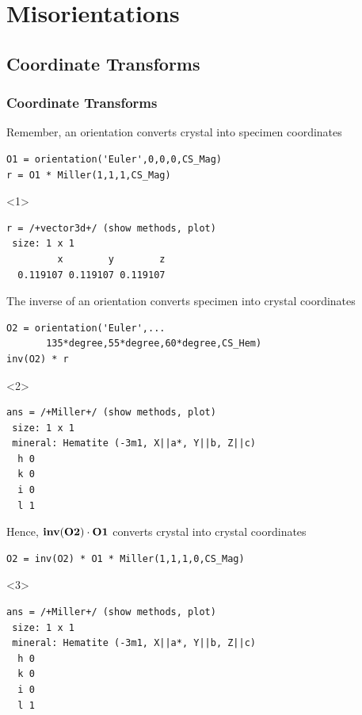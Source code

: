 \documentclass[compress]{beamer}
\begin{document}
\section{Misorientations}


\subsection*{Coordinate Transforms}
\label{sec:orientations}


\begin{frame}[fragile]
  \frametitle{Coordinate Transforms}

  \begin{overlayarea}{\textwidth}{8cm}
  Remember, an orientation converts crystal into specimen
  coordinates
  \vspace{-.2cm}
  \begin{lstlisting}[style=input]
O1 = orientation('Euler',0,0,0,CS_Mag)
r = O1 * Miller(1,1,1,CS_Mag)
\end{lstlisting}
  \begin{onlyenv}<1>
\vspace{-.3cm}\begin{lstlisting}[style=output]
r = /+vector3d+/ (show methods, plot)
 size: 1 x 1
         x        y        z
  0.119107 0.119107 0.119107
\end{lstlisting}
  \end{onlyenv}

  \pause
  \medskip

  The inverse of an orientation converts specimen into crystal coordinates
  \vspace{-.2cm}
  \begin{lstlisting}[style=input]
O2 = orientation('Euler',...
       135*degree,55*degree,60*degree,CS_Hem)
inv(O2) * r
\end{lstlisting}
  \begin{onlyenv}<2>
    \vspace{-.3cm}
    \begin{lstlisting}[style=output]
ans = /+Miller+/ (show methods, plot)
 size: 1 x 1
 mineral: Hematite (-3m1, X||a*, Y||b, Z||c)
  h 0
  k 0
  i 0
  l 1

\end{lstlisting}
  \end{onlyenv}

  \pause
  \medskip

  Hence, $\text{\bf inv}(\mathbf{O2}) \cdot \mathbf{O1}$ converts crystal  into
  crystal coordinates
    \vspace{-.2cm}
  \begin{lstlisting}[style=input]
O2 = inv(O2) * O1 * Miller(1,1,1,0,CS_Mag)
  \end{lstlisting}
  \begin{onlyenv}<3>
    \vspace{-.3cm}
    \begin{lstlisting}[style=output]
ans = /+Miller+/ (show methods, plot)
 size: 1 x 1
 mineral: Hematite (-3m1, X||a*, Y||b, Z||c)
  h 0
  k 0
  i 0
  l 1


\end{lstlisting}
\end{onlyenv}
\end{overlayarea}
\end{frame}
\end{document}

